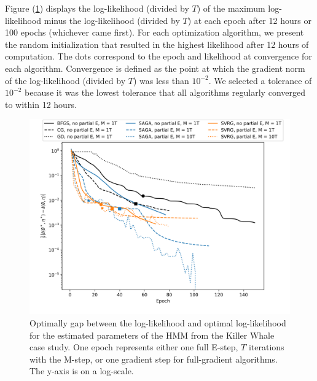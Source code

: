 Figure (\ref{fig:ll_trace_case}) displays the log-likelihood (divided by $T$) of the maximum log-likelihood minus the log-likelihood (divided by $T$) at each epoch after 12 hours or 100 epochs (whichever came first). For each optimization algorithm, we present the random initialization that resulted in the highest likelihood after 12 hours of computation. The dots correspond to the epoch and likelihood at convergence for each algorithm.  Convergence is defined as the point at which the gradient norm of the log-likelihood (divided by $T$) was less than $10^{-2}$. We selected a tolerance of $10^{-2}$ because it was the lowest tolerance that all algorithms regularly converged to within 12 hours. 
%
\begin{figure}
    \centering
    \includegraphics[width=6in]{../plt/log-like_v_epoch_K-3-3.png}
    \caption{Optimally gap between the log-likelihood and optimal log-likelihood for the estimated parameters of the HMM from the Killer Whale case study. One epoch represents either one full E-step, $T$ iterations with the M-step, or one gradient step for full-gradient algorithms. The y-axis is on a log-scale.}
    \label{fig:ll_trace_case}
\end{figure}

